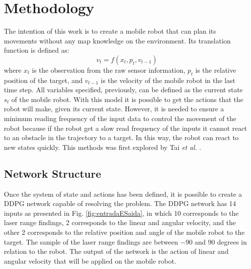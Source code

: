 \section{Methodology}

The intention of this work is to create a mobile robot that can plan its movements without any map knowledge on the environment. Its translation function is defined as:
\begin{equation}
v_t = f(x_t, p_t, v_{t-1})
\end{equation}
where $x_t$ is the observation from the raw sensor information, $p_t$ is the relative position of the target, and $v_{t-1}$ is the velocity of the mobile robot in the last time step.
All variables specified, previously, can be defined as the current state $s_t$ of the mobile robot.
With this model it is possible to get the actions that the robot will make, given its current state.
However, it is needed to ensure a minimum reading frequency of the input data to control the movement of the robot because if the robot get a slow read frequency of the inputs it cannot react to an obstacle in the trajectory to a target. In this way, the robot can react to new states quickly.
This methods was first explored by Tai \textit{et al.} \cite{tai2017virtual}.

\subsection{Network Structure}

Once the system of state and actions has been defined, it is possible to create a DDPG network capable of resolving the problem.
The DDPG network has 14 inputs as presented in Fig. \ref{fig:entradaESaida}, in which 10 corresponds to the laser range findings, 2 corresponds to the linear and angular velocity, and the other 2 corresponds to the relative position and angle of the mobile robot to the target.
The sample of the laser range findings are between $-90$ and $90$ degrees in relation to the robot. The output of the network is the action of linear and angular velocity that will be applied on the mobile robot.

